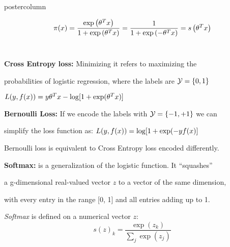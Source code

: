 \documentclass{beamer}
\begin{document}
\begin{frame}[fragile]{}
\begin{columns}
\begin{column}{.31\textwidth}
\begin{beamercolorbox}[center]{postercolumn}
\begin{minipage}{.98\textwidth}
{\begin{myblock}{ }
						\[ \pi(x) = \frac{\exp\left(\theta^Tx\right)}{1+\exp\left(\theta^Tx\right)} = \frac{1}{1+\exp\left(-\theta^Tx\right)} = s\left(\theta^T x\right) \]
						\\
						\begin{codebox}
							\textbf{Cross Entropy loss: }Minimizing it refers to maximizing the
						\end{codebox}
						\begin{codebox}
							probabilities of logistic regression, where the labels are $\mathcal{Y} = \{0,1\}$
						\end{codebox}
						\hspace*{1ex}$L(y, f(x)) = y \theta^T x - \log[1 + \exp(\theta^T x)]$
						\\
						\begin{codebox}
							 \textbf{Bernoulli Loss: }If we encode the labels with $\mathcal{Y} = \{-1,+1\}$ we can
						\end{codebox}
						\begin{codebox}
							 simplify the loss function as: $L(y, f(x)) = \log[1 + \exp(-y f(x)] $
						\end{codebox}
						\hspace*{1ex}Bernoulli loss is equivalent to Cross Entropy loss encoded differently.
						\\
						\begin{codebox}
							 \textbf{Softmax: }is a generalization of the logistic function. It \enquote{squashes}
						\end{codebox}
						\begin{codebox}
							 a g-dimensional real-valued vector $z$ to a vector of the same dimension,
						\end{codebox}
						\begin{codebox}
							  with every entry in the range [0, 1] and all entries adding up to 1.
						\end{codebox}
						\hspace*{1ex}\emph{Softmax} is defined on a numerical vector $z$: $$ s(z)_k = \frac{\exp(z_k)}{\sum_{j}\exp(z_j)} $$
					\end{myblock}
				}
			\end{minipage}
		\end{beamercolorbox}
	\end{column}
\end{columns}
\end{frame}
\end{document}
